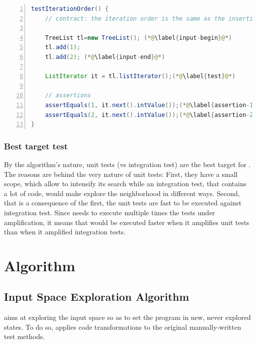 \begin{lstlisting}[caption={An example of an object-oriented test case  (inspired from Apache Commons Collections)},label=lst:archetype,float,language=java,numbers=left] 
testIterationOrder() {
	// contract: the iteration order is the same as the insertion order
	
	TreeList tl=new TreeList(); (*@\label{input-begin}@*)
	tl.add(1);
	tl.add(2); (*@\label{input-end}@*)
	
	ListIterator it = tl.listIterator();(*@\label{test}@*)
	
	// assertions
	assertEquals(1, it.next().intValue());(*@\label{assertion-1}@*)
	assertEquals(2, it.next().intValue());(*@\label{assertion-2}@*)
}
\end{lstlisting}

\subsubsection{Best target test}
\label{subsubsec:dspot:overview:appliance-to-unit-test:target-test}

By the algorithm's nature, unit tests (vs integration test) are the best target for \dspot.
The reasons are behind the very nature of unit tests:
First, they have a small scope, which allow \dspot to intensify its search while an integration test, that contains a lot of code, would make \dspot explore the neighborhood in different ways.
Second, that is a consequence of the first, the unit tests are fast to be executed against integration test.
Since \dspot needs to execute multiple times the tests under amplification, it means that \dspot would be executed faster when it amplifies unit tests than when it amplified integration tests.

\section{Algorithm}
\label{sec:dspot:algorithm}
\subsection{Input Space Exploration Algorithm}
\label{subsec:dspot:algorithm:input-space-exploration}

\dspot aims at exploring the input space so as to set the program in new, never explored states. To do so, \dspot applies code transformations to the original manually-written test methods. 

